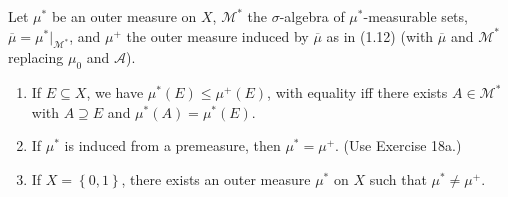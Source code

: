 \newpage

\begin{exercise}
    Let \( \mu^{\ast} \) be an outer measure on \( X \), \( \mathcal{M}^{\ast} \) the \( \sigma \)-algebra of \( \mu^{\ast} \)-measurable sets, \( \overline{\mu} = \mu^{\ast}\vert_{\mathcal{M}^{\ast}} \), and \( \mu^{+} \) the outer measure induced by \( \overline{\mu} \) as in (1.12) (with \( \overline{\mu} \) and \( \mathcal{M}^{\ast} \) replacing \(\mu_{0}\) and \(\mathcal{A}\)).
    \begin{enumerate}[itemsep=0pt,label={\textbf{\alph*.}}]
        \item If \( E \subseteq X \), we have \( \mu^{\ast}(E) \le \mu^{+}(E) \), with equality iff there exists \( A \in \mathcal{M}^{\ast} \) with \( A \supseteq E \) and \( \mu^{\ast}(A) = \mu^{\ast}(E) \).
        \item If \( \mu^{\ast} \) is induced from a premeasure, then \( \mu^{\ast} = \mu^{+} \). (Use Exercise 18a.)
        \item If \( X = \left\{ 0, 1 \right\} \), there exists an outer measure \( \mu^{\ast} \) on \( X \) such that \( \mu^{\ast} \ne \mu^{+} \).
    \end{enumerate}
\end{exercise}


